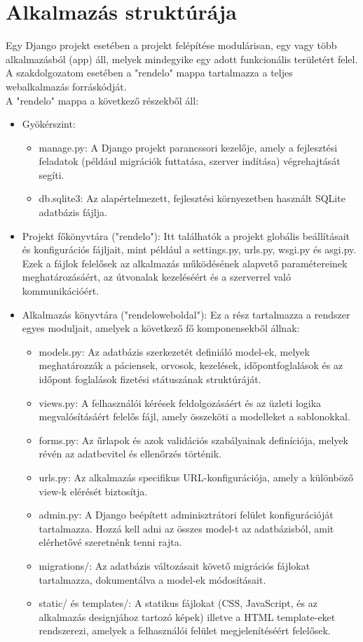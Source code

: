 \chapter{Alkalmazás struktúrája}
\label{chap:fejezet2}

Egy Django projekt esetében a projekt felépítése modulárisan, egy vagy több alkalmazásból (app) áll, melyek mindegyike egy adott funkcionális területért felel. A szakdolgozatom esetében a "rendelo" mappa tartalmazza a teljes webalkalmazás forráskódját.\\
A "rendelo" mappa a következő részekből áll:

\begin{itemize}
	\item Gyökérszint:
	\begin{itemize}
		\item manage.py: A Django projekt parancssori kezelője, amely a fejlesztési feladatok (például migrációk futtatása, szerver indítása) végrehajtását segíti.
		\item db.sqlite3: Az alapértelmezett, fejlesztési környezetben használt SQLite adatbázis fájlja.
	\end{itemize}
	\item Projekt főkönyvtára ("rendelo"): Itt találhatók a projekt globális beállításait és konfigurációs fájljait, mint például a settings.py, urls.py, wsgi.py és asgi.py. Ezek a fájlok felelősek az alkalmazás működésének alapvető paramétereinek meghatározásáért, az útvonalak kezeléséért és a szerverrel való kommunikációért.
	\item Alkalmazás könyvtára ("rendeloweboldal"): Ez a rész tartalmazza a rendszer egyes moduljait, amelyek a következő fő komponensekből állnak:
	\begin{itemize}
		\item models.py: Az adatbázis szerkezetét definiáló model-ek, melyek meghatározzák a páciensek, orvosok, kezelések, időpontfoglalások és az időpont foglalások fizetési státuszának struktúráját.
		\item views.py: A felhasználói kérések feldolgozásáért és az üzleti logika megvalósításáért felelős fájl, amely összeköti a modelleket a sablonokkal.
		\item forms.py: Az űrlapok és azok validációs szabályainak definíciója, melyek révén az adatbevitel és ellenőrzés történik.
		\item urls.py: Az alkalmazás specifikus URL-konfigurációja, amely a különböző view-k elérését biztosítja.
		\item admin.py: A Django beépített adminisztrátori felület konfigurációját tartalmazza. Hozzá kell adni az összes model-t az adatbázisból, amit elérhetővé szeretnénk tenni rajta.
		\item migrations/: Az adatbázis változásait követő migrációs fájlokat tartalmazza, dokumentálva a model-ek módosításait.
		\item static/ és templates/: A statikus fájlokat (CSS, JavaScript, és az alkalmazás designjához tartozó képek) illetve a HTML template-eket rendszerezi, amelyek a felhasználói felület megjelenítéséért felelősek.
	\end{itemize}
\end{itemize}


